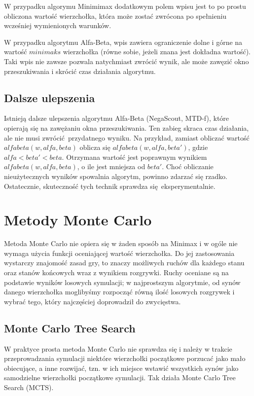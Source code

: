 \documentclass{pracamgr}
\begin{document}
W przypadku algorymu Minimimax dodatkowym polem wpisu jest to po prostu obliczona wartość wierzchołka, która może zostać zwrócona po spełnieniu wcześniej wymienionych warunków.

W przypadku algorytmu Alfa-Beta, wpis zawiera ograniczenie dolne i górne na wartość \(minimaks\) wierzchołka (równe sobie, jeżeli znana jest dokładna wartość).
Taki wpis nie zawsze pozwala natychmiast zwrócić wynik, ale może zawęzić okno przeszukiwania i skrócić czas działania algorytmu.

\subsection{Dalsze ulepszenia}

Istnieją dalsze ulepszenia algorytmu Alfa-Beta (NegaScout, MTD-f), które opierają się na zawężaniu okna przeszukiwania.
Ten zabieg skraca czas działania, ale nie musi zwrócić przydatnego wyniku.
Na przykład, zamiast obliczać wartość \(alfabeta(w, alfa, beta)\) oblicza się \(alfabeta(w, alfa, beta')\), gdzie \(alfa < beta' < beta\).
Otrzymana wartość jest poprawnym wynikiem \(alfabeta(w, alfa, beta)\), o ile jest mniejsza od \(beta'\).
Choć obliczanie nieużytecznych wyników spowalnia algorytm, powinno zdarzać się rzadko.
Ostatecznie, skuteczność tych technik sprawdza się eksperymentalnie.

\section{Metody Monte Carlo}

Metoda Monte Carlo nie opiera się w żaden sposób na Minimax i w ogóle nie wymaga użycia funkcji oceniającej wartość wierzchołka.
Do jej zastosowania wystarczy znajomość zasad gry, to znaczy możliwych ruchów dla każdego stanu oraz stanów końcowych wraz z wynikiem rozgrywki.
Ruchy oceniane są na podstawie wyników losowych symulacji; w najprostszym algorytmie, od synów danego wierzchołka moglibyśmy rozpocząć równą ilość losowych rozgrywek i wybrać tego, który najczęściej doprowadził do zwycięstwa.

\subsection{Monte Carlo Tree Search}

W praktyce prosta metoda Monte Carlo nie sprawdza się i należy w trakcie przeprowadzania symulacji niektóre wierzchołki początkowe porzucać jako mało obiecujące, a inne rozwijać, tzn. w ich miejsce wstawić wszystkich synów jako samodzielne wierzchołki początkowe symulacji.
Tak działa Monte Carlo Tree Search (MCTS).
\end{document}
